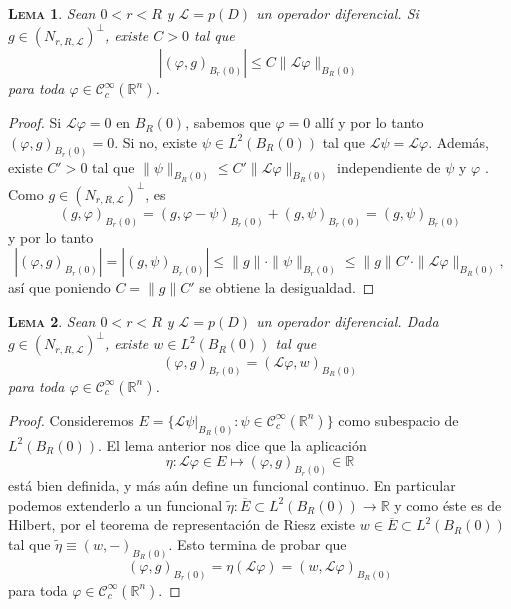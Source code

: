 \documentclass[11pt]{article}
\theoremstyle{colored}
\newtheorem{lemma}{\scshape Lema}
\newcommand{\R}{\mathbb{R}}
\newcommand{\C}{\mathscr{C}}
\newcommand{\ip}[1]{( #1 )}
\renewcommand{\L}{\mathscr{L}}
\begin{document}
\begin{lemma} \label{lema-cota-lp-r-R}Sean $0 < r < R$ y $\L = p(D)$ un operador diferencial. Si $g \in (N_{r,R,\L})^\perp$, existe $C > 0$ tal que
\[
|(\varphi,g)_{B_r(0)}| \leq C\|\L \varphi\|_{B_R(0)}
\]
para toda $\varphi \in \C_c^\infty(\R^n)$.
\end{lemma}
\begin{proof} Si $\L \varphi = 0$ en $B_R(0)$, sabemos que $\varphi = 0$ allí y por lo tanto $(\varphi,g)_{B_r(0)} = 0$. Si no, existe $\psi \in L^2(B_R(0))$ tal que $\L \psi = \L \varphi$. Además, existe  $C' > 0$ tal que $\|\psi\|_{B_R(0)} \leq C'\|\L \varphi\|_{B_R(0)}$ independiente de $\psi$ y $\varphi$ . Como $g \in (N_{r,R,\L})^\perp$, es
\[
\ip{g,\varphi}_{B_r(0)} = \ip{g,\varphi-\psi}_{B_r(0)} + \ip{g,\psi}_{B_r(0)} = \ip{g,\psi}_{B_r(0)}
\]
y por lo tanto
\[
|(\varphi,g)_{B_r(0)}| = |\ip{g,\psi}_{B_r(0)}| \leq \|g\| \cdot \|\psi\|_{B_r(0)} \leq \|g\|C' \cdot \|\L \varphi\|_{B_R(0)},
\]
así que poniendo $C = \|g\|C'$ se obtiene la desigualdad.
\end{proof}

\begin{lemma} \label{lema-rep} Sean $0 < r < R$ y $\L = p(D)$ un operador diferencial. Dada $g \in (N_{r,R,\L})^\perp$, existe $w\in L^2(B_R(0))$ tal que
\[
(\varphi,g)_{B_r(0)} = (\L \varphi, w)_{B_R(0)}
\]
para toda $\varphi \in \C_c^\infty(\R^n)$.
\end{lemma}
\begin{proof} Consideremos $E = \{ \L\psi|_{B_R(0)} : \psi \in \C_c^\infty(\R^n)\}$ como subespacio de $L^2(B_R(0))$. El lema anterior nos dice que la aplicación 
\[
\eta : \L \varphi \in E \mapsto \ip{\varphi,g}_{B_r(0)} \in \R
\]
está bien definida, y más aún define un funcional continuo. En particular podemos extenderlo a un funcional $\widetilde{\eta} : \overline{E} \subset L^2(B_R(0)) \to \R$ y como éste es de Hilbert, por el teorema de representación de Riesz existe $w \in \overline{E} \subset L^2(B_R(0))$ tal que $\widetilde{\eta} \equiv (w,-)_{B_R(0)}$. Esto termina de probar que
\[
(\varphi,g)_{B_r(0)} = \eta(\L \varphi) = (w,\L \varphi)_{B_R(0)}
\]
para toda $\varphi \in \C_c^\infty(\R^n)$.
\end{proof}
\end{document}
